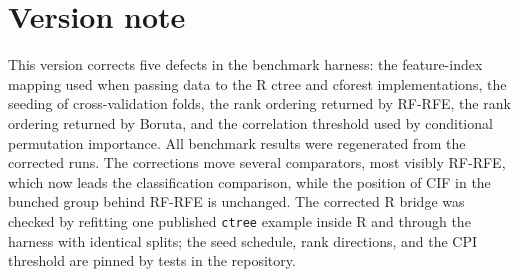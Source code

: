 \section{Version note}
\label{app:version-note}

This version corrects five defects in the benchmark harness: the feature-index
mapping used when passing data to the R ctree and cforest implementations, the
seeding of cross-validation folds, the rank ordering returned by RF-RFE, the
rank ordering returned by Boruta, and the correlation threshold used by
conditional permutation importance. All benchmark results were regenerated from
the corrected runs. The corrections move several comparators, most visibly
RF-RFE, which now leads the classification comparison, while the position of CIF in the bunched group behind RF-RFE is unchanged.
The corrected R bridge was checked by refitting one published \texttt{ctree}
example inside R and through the harness with identical splits; the seed
schedule, rank directions, and the CPI threshold are pinned by tests in the
repository.
